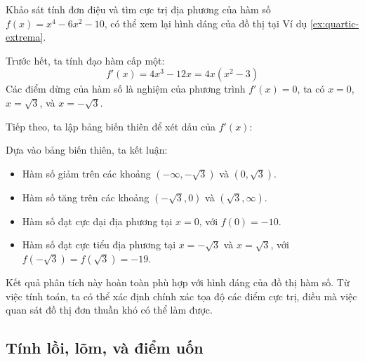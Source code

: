\begin{example}
Khảo sát tính đơn điệu và tìm cực trị địa phương của hàm số $f(x) = x^4 - 6x^2 - 10$, có thể xem lại hình dáng của đồ thị tại Ví dụ \ref{ex:quartic-extrema}.
\begin{solution}
Trước hết, ta tính đạo hàm cấp một:
$$ f'(x) = 4x^3 - 12x = 4x(x^2 - 3) $$
Các điểm dừng của hàm số là nghiệm của phương trình $f'(x)=0$, ta có $x=0$, $x=\sqrt{3}$, và $x=-\sqrt{3}$.

Tiếp theo, ta lập bảng biến thiên để xét dấu của $f'(x)$:

\begin{center}
\end{center}
Dựa vào bảng biến thiên, ta kết luận:
\begin{itemize}
    \item Hàm số giảm trên các khoảng $(-\infty, -\sqrt{3})$ và $(0, \sqrt{3})$.
    \item Hàm số tăng trên các khoảng $(-\sqrt{3}, 0)$ và $(\sqrt{3}, \infty)$.
    \item Hàm số đạt cực đại địa phương tại $x=0$, với $f(0)=-10$.
    \item Hàm số đạt cực tiểu địa phương tại $x=-\sqrt{3}$ và $x=\sqrt{3}$, với $f(-\sqrt{3}) = f(\sqrt{3}) = -19$.
\end{itemize}
Kết quả phân tích này hoàn toàn phù hợp với hình dáng của đồ thị hàm số. Từ việc tính toán, ta có thể xác định chính xác tọa độ các điểm cực trị, điều mà việc quan sát đồ thị đơn thuần khó có thể làm được.
\end{solution}
\end{example}

\subsection{Tính lồi, lõm, và điểm uốn}
\label{subsec:convexity-inflection}

